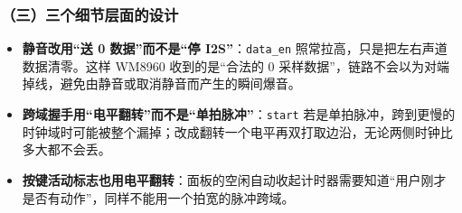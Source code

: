 \documentclass[withoutpreface,bwprint]{cumcmthesis}
\begin{document}
\subsubsection*{（三）三个细节层面的设计}

\begin{itemize}
\item \textbf{静音改用“送 0 数据”而不是“停 I2S”}：\texttt{data\_en} 照常拉高，只是把左右声道数据清零。这样 WM8960 收到的是“合法的 0 采样数据”，链路不会以为对端掉线，避免由静音或取消静音而产生的瞬间爆音。
\item \textbf{跨域握手用“电平翻转”而不是“单拍脉冲”}：\texttt{start} 若是单拍脉冲，跨到更慢的时钟域时可能被整个漏掉；改成翻转一个电平再双打取边沿，无论两侧时钟比多大都不会丢。
\item \textbf{按键活动标志也用电平翻转}：面板的空闲自动收起计时器需要知道“用户刚才是否有动作”，同样不能用一个拍宽的脉冲跨域。
\end{itemize}

%
%
%
\end{document}
